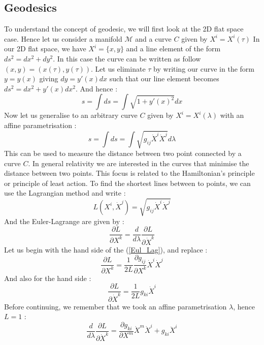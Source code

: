 \documentclass[a4paper,12pt]{article}
\theoremstyle{definition}
\begin{document}
\subsection{Geodesics}
To understand the concept of geodesic, we will first look at the 2D flat space case.
Hence let us consider a manifold $\mathcal{M}$ and a curve $C$ given by $X^i=X^i(\tau)$
In our 2D flat space, we have $X^i=\{x,y\}$ and a line element of the form $ds^2=dx^2+dy^2$.
In this case the curve can be written as follow $(x,y)=(x(\tau),y(\tau))$.
Let us eliminate $\tau$ by writing our curve in the form $y=y(x)$ giving $dy=y'(x)dx$ such that our line element becomes $ds^2=dx^2+y'(x)dx^2$.
And hence :
\begin{equation}
	s=\int ds=\int \sqrt{1+y'(x)^2}dx
\end{equation}
Now let us generalise to an arbitrary curve $C$ given by $X^i=X^i(\lambda)$ with an affine parametrisation :
\begin{equation}
	s=\int ds=\int \sqrt{g_{ij}\dot{X}^i\dot{X}^j}d\lambda
\end{equation}
This can be used to measure the distance between two point connected by a curve $C$.
In general relativity we are interested in the curves that minimise the distance between two points.
This focus is related to the Hamiltonian's principle or principle of least action.
To find the shortest lines between to points, we can use the Lagrangian method and write :
\begin{equation}
	L(X^i,\dot{X}^j)=\sqrt{g_{ij}\dot{X}^i\dot{X}^j}
\end{equation}
And the Euler-Lagrange are given by :
\begin{equation}\label{Eul_Lag}
	\frac{\partial L}{\partial X^k}=\frac{d}{d\lambda}\frac{\partial L}{\partial \dot{X}^k}
\end{equation}
Let us begin with the hand side of the (\ref{Eul_Lag}), and replace :
\begin{equation}
	\frac{\partial L}{\partial X^k}=\frac{1}{2L}\frac{\partial g_{ij}}{\partial X^k}\dot{X}^i\dot{X}^j
\end{equation}
And also for the hand side :
\begin{equation}
	\frac{\partial L}{\partial \dot{X}^k}=\frac{1}{2L}g_{ki}\dot{X}^i
\end{equation}
Before continuing, we remember that we took an affine parametrisation $\lambda$, hence $L=1$ :
\begin{equation}
	\frac{d}{d\lambda}\frac{\partial L}{\partial \dot{X}^k}=
	\frac{\partial g_{ki}}{\partial X^m}\dot{X}^m\dot{X}^i+g_{ki}\ddot{X}^i
\end{equation}
\end{document}
